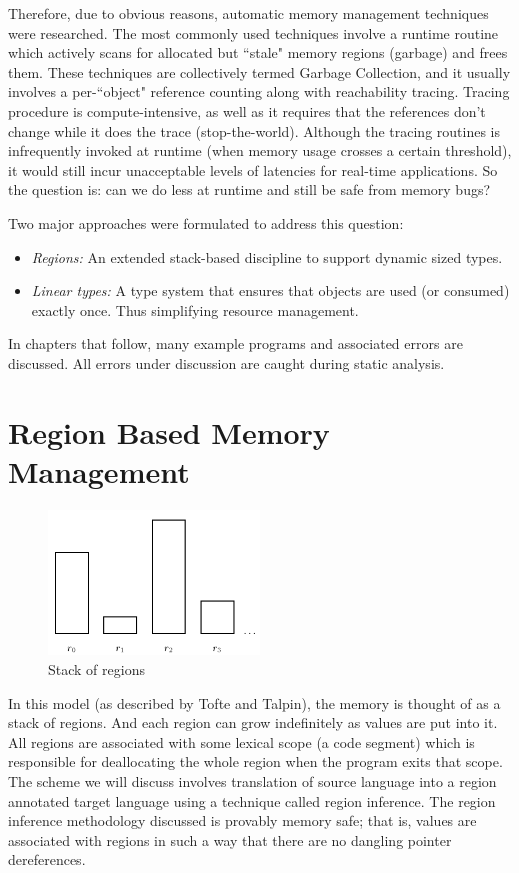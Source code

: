 \documentclass[11pt]{report}
\begin{document}
Therefore, due to obvious reasons, automatic memory management techniques were researched. The most commonly used techniques involve a runtime routine which actively scans for allocated but ``stale" memory regions (garbage) and frees them. These techniques are collectively termed Garbage Collection, and it usually involves a per-``object" reference counting along with reachability tracing. Tracing procedure is compute-intensive, as well as it requires that the references don’t change while it does the trace (stop-the-world). Although the tracing routines is infrequently invoked at runtime (when memory usage crosses a certain threshold), it would still incur unacceptable levels of latencies for real-time applications. So the question is: can we do less at runtime and still be safe from memory bugs?

Two major approaches were formulated to address this question:

\begin{itemize}
\item \textit{Regions:} An extended stack-based discipline to support dynamic sized types.
\item \textit{Linear types:} A type system that ensures that objects are used (or consumed) exactly once. Thus simplifying resource management.
\end{itemize}

In chapters that follow, many example programs and associated errors are discussed. All errors under discussion are caught during static analysis.

\chapter{Region Based Memory Management}

\begin{figure}
\centering
\includegraphics[width=0.5\textwidth]{regions-blocks.png}
\caption{Stack of regions}
\end{figure}

In this model (as described by Tofte and Talpin\cite{tofterbmm}), the memory is thought of as a stack of regions. And each region can grow indefinitely as values are put into it. All regions are associated with some lexical scope (a code segment) which is responsible for deallocating the whole region when the program exits that scope. The scheme we will discuss involves translation of source language into a region annotated target language using a technique called region inference. The region inference methodology discussed is provably memory safe; that is, values are associated with regions in such a way that there are no dangling pointer dereferences.
\end{document}
